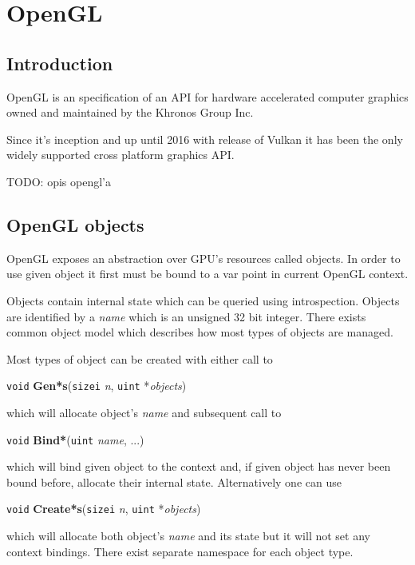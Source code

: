 \chapter{OpenGL}

\section{Introduction}

OpenGL is an specification of an API for hardware accelerated computer graphics owned and maintained by the Khronos Group Inc.

Since it's inception  and up until 2016 with release of Vulkan it has been the only widely supported cross platform graphics API.


TODO: opis opengl'a

\section{OpenGL objects}

OpenGL exposes an abstraction over GPU's resources called objects. In order to use given object it first must be bound to a var point in current OpenGL context. 

Objects contain internal state which can be queried using introspection. Objects are identified by a \textit{name} which is an unsigned 32 bit integer. There exists common object model which describes how most types of objects are managed.

\noindent Most types of object can be created with either call to\\

\centerline{
    \texttt{void} \textbf{Gen*s}(\texttt{sizei} \textit{n}, \texttt{uint} *\textit{objects})
}
\noindent which will allocate object's \textit{name} and subsequent call to \\

\centerline{
    \texttt{void} \textbf{Bind*}(\texttt{uint} \textit{name}, ...)
}
\noindent which will bind given object to the context and, if given object has never been bound before, allocate their internal state. Alternatively one can use\\

\centerline {
    \texttt{void} \textbf{Create*s}(\texttt{sizei} \textit{n}, \texttt{uint} *\textit{objects})
}
\noindent which will allocate both object's \textit{name} and its state but it will not set any context bindings. There exist separate namespace for each object type.

